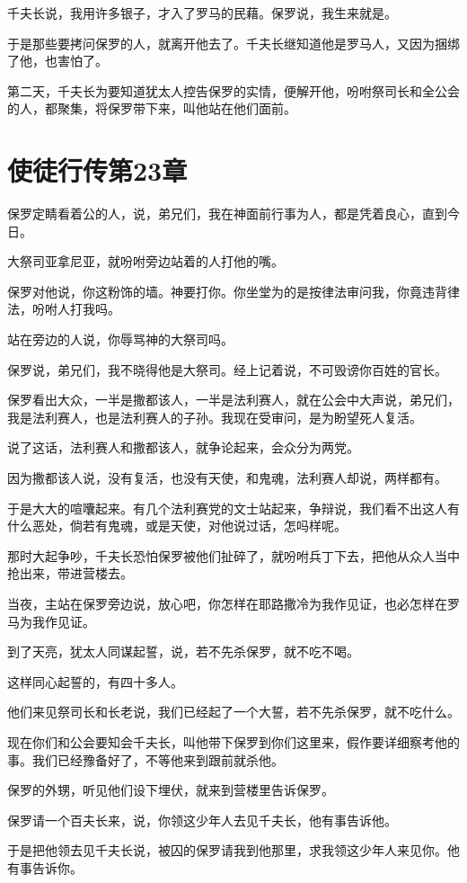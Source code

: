 \documentclass[12pt,oneside]{book}
\begin{document}
千夫长说，我用许多银子，才入了罗马的民藉。保罗说，我生来就是。

于是那些要拷问保罗的人，就离开他去了。千夫长继知道他是罗马人，又因为捆绑了他，也害怕了。

第二天，千夫长为要知道犹太人控告保罗的实情，便解开他，吩咐祭司长和全公会的人，都聚集，将保罗带下来，叫他站在他们面前。

\chapter{使徒行传第23章}
保罗定睛看着公的人，说，弟兄们，我在神面前行事为人，都是凭着良心，直到今日。

大祭司亚拿尼亚，就吩咐旁边站着的人打他的嘴。

保罗对他说，你这粉饰的墙。神要打你。你坐堂为的是按律法审问我，你竟违背律法，吩咐人打我吗。

站在旁边的人说，你辱骂神的大祭司吗。

保罗说，弟兄们，我不晓得他是大祭司。经上记着说，不可毁谤你百姓的官长。

保罗看出大众，一半是撒都该人，一半是法利赛人，就在公会中大声说，弟兄们，我是法利赛人，也是法利赛人的子孙。我现在受审问，是为盼望死人复活。

说了这话，法利赛人和撒都该人，就争论起来，会众分为两党。

因为撒都该人说，没有复活，也没有天使，和鬼魂，法利赛人却说，两样都有。

于是大大的喧囔起来。有几个法利赛党的文士站起来，争辩说，我们看不出这人有什么恶处，倘若有鬼魂，或是天使，对他说过话，怎吗样呢。

那时大起争吵，千夫长恐怕保罗被他们扯碎了，就吩咐兵丁下去，把他从众人当中抢出来，带进营楼去。

当夜，主站在保罗旁边说，放心吧，你怎样在耶路撒冷为我作见证，也必怎样在罗马为我作见证。

到了天亮，犹太人同谋起誓，说，若不先杀保罗，就不吃不喝。

这样同心起誓的，有四十多人。

他们来见祭司长和长老说，我们已经起了一个大誓，若不先杀保罗，就不吃什么。

现在你们和公会要知会千夫长，叫他带下保罗到你们这里来，假作要详细察考他的事。我们已经豫备好了，不等他来到跟前就杀他。

保罗的外甥，听见他们设下埋伏，就来到营楼里告诉保罗。

保罗请一个百夫长来，说，你领这少年人去见千夫长，他有事告诉他。

于是把他领去见千夫长说，被囚的保罗请我到他那里，求我领这少年人来见你。他有事告诉你。
\end{document}
